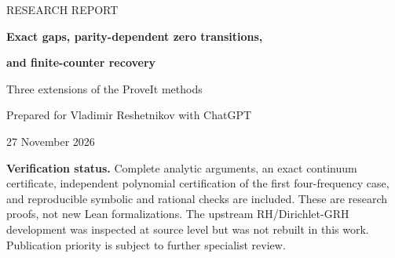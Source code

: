 \documentclass[11pt,letterpaper]{article}
\theoremstyle{remark}
\numberwithin{equation}{section}
\begin{document}
\begin{titlepage}
\centering
\vspace*{1.2cm}
{\large RESEARCH REPORT\par}
\vspace{1cm}
{\LARGE\bfseries Exact gaps, parity-dependent zero transitions,\par}
\vspace{0.2cm}
{\LARGE\bfseries and finite-counter recovery\par}
\vspace{0.8cm}
{\large Three extensions of the ProveIt methods\par}
\vspace{0.8cm}
{\normalsize Prepared for Vladimir Reshetnikov with ChatGPT\par}
{\normalsize 27 November 2026\par}
\vspace{1cm}
\begin{minipage}{0.91\textwidth}
\begin{abstract}
We develop three results from the positive-filter, critical-zero, and
spectral-recovery methods in the ProveIt research collection.
First, an exact integer interval certificate determines the largest
zero-free interval for every spectrum
$\pm\{N,(m+1)N,(2m+1)N,(3m+1)N\}$, $m\ge2$.
The nonresonant odd family has a unique eight-atom dual measure and a
supremum not attained on an open interval. This settles an infinite
four-frequency subfamily of Kozma--Oravecz's wide-progression question.
Second, for complete-graph symmetric edge polytopes with a matching
deleted, we resolve the local multiple-root thresholds left open in the
incoming Ehrhart report. Even and odd dimensions have different relative
parameter windows, $(\log d)^{-2}$ and $(\log d)^{-2/3}$, with explicit
quadratic and cubic normal forms and exact local collision parameters.
Third, microscopic histograms of distinct primitive Dirichlet zero
ordinates satisfy a uniform matrix lower bound. It yields optimal
continuous-mixture estimation from exactly $d$ disjoint Poisson counters,
or $d-1$ when the total intensity is known, and a sharp obstruction for
growing bin widths. The three main mathematical results are unconditional.
Dirichlet GRH enters only the identification with the repository's
Li-coefficient semigroups.
\end{abstract}
\end{minipage}
\vfill
\begin{minipage}{0.91\textwidth}
\small
\textbf{Verification status.} Complete analytic arguments, an exact
continuum certificate, independent polynomial certification of the first
four-frequency case, and reproducible symbolic and rational checks are
included. These are research proofs, not new Lean formalizations.
The upstream RH/Dirichlet-GRH development was inspected at source level
but was not rebuilt in this work. Publication priority is subject to
further specialist review.
\end{minipage}
\end{titlepage}
\end{document}
